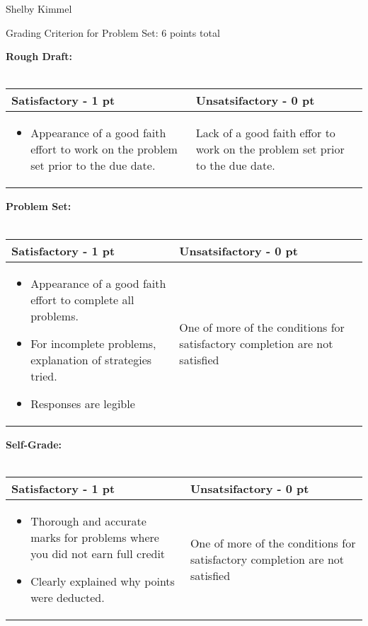 \documentclass[12pt,landscape]{article}
\begin{document}
\hfill Shelby Kimmel

\begin{center}
{\huge Grading Criterion for Problem Set: 6 points total}
\end{center}
\bigskip

{\large \textbf{Rough Draft:}}\\~\\
{\renewcommand{\arraystretch}{2}
\begin{tabular}{|p{13cm}|p{7cm}|}
\hline
{\bf Satisfactory - 1 pt}& {\bf Unsatsifactory - 0 pt}\\
\hline
\begin{itemize}
\item Appearance of a good faith effort to work on the problem set prior to the due date.
\end{itemize}
  & Lack of a good faith effor to work on the problem set prior to the due date.\\
  \hline
\end{tabular}}
\bigskip
\bigskip

{\large \textbf{Problem Set:}}\\~\\
{\renewcommand{\arraystretch}{2}
\begin{tabular}{|p{13cm}|p{7cm}|}
\hline
{\bf Satisfactory - 1 pt}& {\bf Unsatsifactory - 0 pt}\\
\hline
\begin{itemize}
\item Appearance of a good faith effort to complete all problems.
\item For incomplete problems, explanation of strategies tried.
\item Responses are legible
\end{itemize}
  & One of more of the conditions for satisfactory completion are not satisfied\\
  \hline
\end{tabular}}

\newpage
{\large \textbf{ Self-Grade:}}\\~\\
{\renewcommand{\arraystretch}{2}
\begin{tabular}{|p{13cm}|p{7cm}|}
\hline
{\bf Satisfactory - 1 pt}& {\bf Unsatsifactory - 0 pt}\\
\hline
\begin{itemize}
\item Thorough and accurate marks for problems where you did not earn full credit
\item Clearly explained why points were deducted.
\end{itemize}
  & One of more of the conditions for satisfactory completion are not satisfied\\
  \hline
\end{tabular}}
\end{document}
